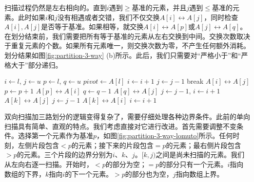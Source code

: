 \documentclass[b5paper]{ctexart}
\begin{document}
扫描过程仍然是左右相向的。直到$i$遇到$\geq$基准的元素，并且$j$遇到$\leq$基准的元素。此时如果$i$和$j$没有相遇或者交错，我们不仅交换$A[i] \leftrightarrow A[j]$，同时检查$A[i], A[j]$是否等于基准。如果相等，就交换$A[i] \leftrightarrow A[p]$或$A[j] \leftrightarrow A[q]$。在划分结束前，我们需要把所有等于基准的元素从左右交换到中间。交换次数取决于重复元素的个数。如果所有元素唯一，则交换次数为零，不产生任何额外消耗。划分结果如图\cref{fig:partition-3-way} (b)所示。此后，我们只需要对“严格小于”和“严格大于”部分递归。

\begin{algorithmic}[1]
    \State $i \gets l$, $j \gets u$
    \State $p \gets l$, $q \gets u$ 
    \State $pivot \gets A[l]$
    \Loop
      \Repeat
        \State $i \gets i + 1$
       
      \Repeat
        \State $j \gets j - 1$
       
        \State break
      \EndIf
      \State {} $A[i] \leftrightarrow A[j]$
       
        \State $p \gets p + 1$
        \State {} $A[p] \leftrightarrow A[i]$
      \EndIf
        \State $q \gets q - 1$
        \State {} $A[q] \leftrightarrow A[j]$
      \EndIf
    \EndLoop
      \State $j \gets j - 1$, $i \gets i + 1$
    \EndIf
     
      \State {} $A[k] \leftrightarrow A[j]$
      \State $j \gets j - 1$
    \EndFor
      \State {} $A[k] \leftrightarrow A[i]$
      \State $i \gets i + 1$
    \EndFor
    \State {}
    \State {}
  \EndIf
\EndProcedure
\end{algorithmic}

双向扫描加三路划分的逻辑变得复杂了，需要仔细处理各种边界条件。此前的单向扫描具有简单、直观的特点。我们考虑直接对它进行改进。首先需要调整不变条件。选择第一个元素作为基准$p$，如图\cref{fig:partition-3-way-lomuto}所示。任何时刻，左侧片段包含$< p$的元素；接下来的片段包含$= p$的元素；最右侧片段包含$> p$的元素。三个片段的边界分别为$i$、$k$、$j$。$[k, j)$之间是尚未扫描的元素。我们从左向右逐一扫描。开始时，$< p$的部分为空；$= p$的部分只有一个元素。$i$指向数组的下界，$k$指向$i$的下一个元素。$> p$的部分也为空，$j$指向数组上界。
\end{document}
